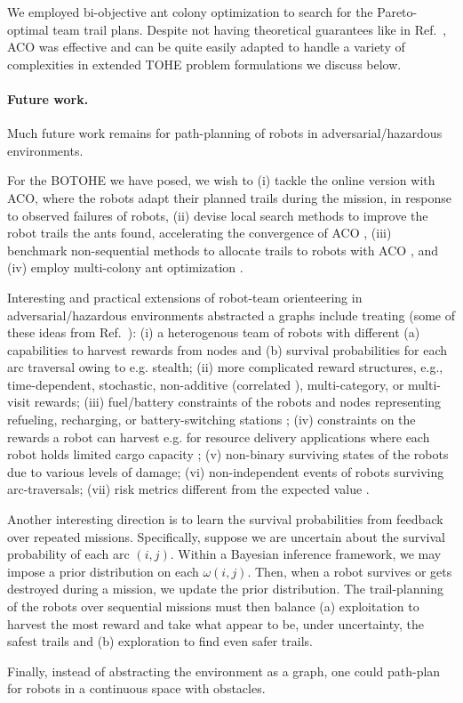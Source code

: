 \documentclass[11pt, oneside]{article}
\begin{document}
We employed bi-objective ant colony optimization to search for the Pareto-optimal team trail plans. Despite not having theoretical guarantees like in Ref.~\cite{jorgensen2018team}, ACO was effective and can be quite easily adapted to handle a variety of complexities in extended TOHE problem formulations we discuss below.


\paragraph{Future work.}
Much future work remains for path-planning of robots in adversarial/hazardous environments.

For the BOTOHE we have posed, we wish to (i) tackle the online version with ACO, where the robots adapt their planned trails during the mission, in response to observed failures of robots, (ii) devise local search methods to improve the robot trails the ants found, accelerating the convergence of ACO \cite{dorigo2006ant}, (iii) benchmark non-sequential methods to allocate trails to robots with ACO \cite{ke2008ants}, and (iv) employ multi-colony ant optimization \cite{iredi2001bi}.

Interesting and practical extensions of robot-team orienteering in adversarial/hazardous environments abstracted a graphs include treating (some of these ideas from Ref.~\cite{jorgensen2018team}): 
(i) a heterogenous team of robots with different (a) capabilities to harvest rewards from nodes and (b) survival probabilities for each arc traversal owing to e.g. stealth;
(ii) more complicated reward structures, e.g., time-dependent, stochastic, non-additive (correlated \cite{yu2014correlated}), multi-category, or multi-visit rewards;
(iii) fuel/battery constraints of the robots and nodes representing refueling, recharging, or battery-switching stations \cite{asghar2023risk,khuller2011fill,liao2016electric}; 
(iv) constraints on the rewards a robot can harvest e.g. for resource delivery applications where each robot holds limited cargo capacity \cite{coelho2014thirty};
(v) non-binary surviving states of the robots due to various levels of damage;
(vi) non-independent events of robots surviving arc-traversals;
(vii) risk metrics different from the expected value \cite{majumdar2020should}.

Another interesting direction is to learn the survival probabilities from feedback over repeated missions. 
Specifically, suppose we are uncertain about the survival probability of each arc $(i,j)$. Within a Bayesian inference framework, we may impose a prior distribution on each $\omega(i,j)$. Then, when a robot survives or gets destroyed during a mission, we update the prior distribution. 
The trail-planning of the robots over sequential missions must then balance (a) exploitation to harvest the most reward and take what appear to be, under uncertainty, the safest trails and (b) exploration to find even safer trails.

Finally, instead of abstracting the environment as a graph, one could path-plan for robots in a continuous space with obstacles. 



\end{document}
